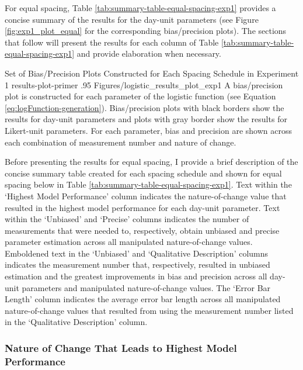 \documentclass[
12pt, %
twoside,
english]{guelphthesis}
\begin{document}
For equal spacing, Table \ref{tab:summary-table-equal-spacing-exp1} provides a concise summary of the results for the day-unit parameters (see Figure \ref{fig:exp1_plot_equal} for the corresponding bias/precision plots). The sections that follow will present the results for each column of Table \ref{tab:summary-table-equal-spacing-exp1} and provide elaboration when necessary.
\begin{apaFigure}
[portrait]
[samepage]
[-0.2cm]
{Set of Bias/Precision Plots Constructed for Each Spacing Schedule in Experiment 1}
{results-plot-primer}
{.95}
{Figures/logistic_results_plot_exp1}
{A bias/precision plot is constructed for each parameter of the logistic function (see Equation \ref{eq:logFunction-generation}). Bias/precision plots with black borders show the results for day-unit parameters and plots with gray border show the results for Likert-unit parameters. For each parameter, bias and precision are shown across each combination of measurement number and nature of change.}\end{apaFigure}

Before presenting the results for equal spacing, I provide a brief description of the concise summary table created for each spacing schedule and shown for equal spacing below in Table \ref{tab:summary-table-equal-spacing-exp1}. Text within the `Highest Model Performance' column indicates the nature-of-change value that resulted in the highest model performance for each day-unit parameter. Text within the `Unbiased' and `Precise' columns indicates the number of measurements that were needed to, respectively, obtain unbiased and precise parameter estimation across all manipulated nature-of-change values. Emboldened text in the `Unbiased' and `Qualitative Description' columns indicates the measurement number that, respectively, resulted in unbiased estimation and the greatest improvements in bias and precision across all day-unit parameters and manipulated nature-of-change values. The `Error Bar Length' column indicates the average error bar length across all manipulated nature-of-change values that resulted from using the measurement number listed in the `Qualitative Description' column.

\hypertarget{nature-change-equal-exp1}{%
\subsubsection{Nature of Change That Leads to Highest Model Performance}\label{nature-change-equal-exp1}}
\end{document}
